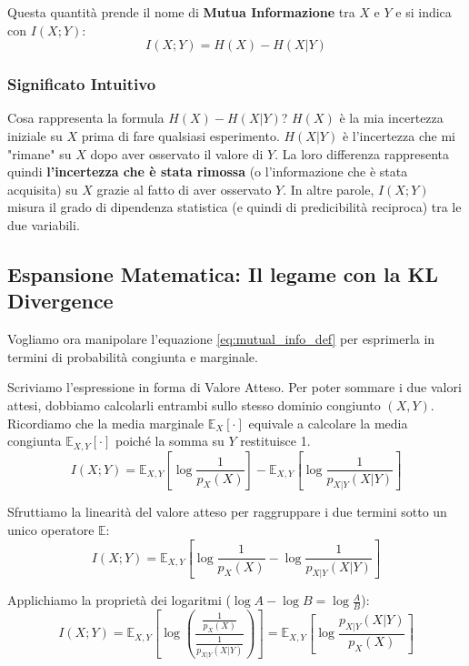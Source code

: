 Questa quantità prende il nome di \textbf{Mutua Informazione} tra $X$ e $Y$ e si indica con $I(X;Y)$:
\begin{equation}
\label{eq:mutual_info_def}
    I(X;Y) = H(X) - H(X|Y)
\end{equation}

\subsubsection*{Significato Intuitivo}
Cosa rappresenta la formula $H(X) - H(X|Y)$? 
$H(X)$ è la mia incertezza iniziale su $X$ prima di fare qualsiasi esperimento. $H(X|Y)$ è l'incertezza che mi "rimane" su $X$ dopo aver osservato il valore di $Y$. 
La loro differenza rappresenta quindi \textbf{l'incertezza che è stata rimossa} (o l'informazione che è stata acquisita) su $X$ grazie al fatto di aver osservato $Y$. In altre parole, $I(X;Y)$ misura il grado di dipendenza statistica (e quindi di predicibilità reciproca) tra le due variabili.

\subsection{Espansione Matematica: Il legame con la KL Divergence}

Vogliamo ora manipolare l'equazione \ref{eq:mutual_info_def} per esprimerla in termini di probabilità congiunta e marginale. 

Scriviamo l'espressione in forma di Valore Atteso. Per poter sommare i due valori attesi, dobbiamo calcolarli entrambi sullo stesso dominio congiunto $(X,Y)$. Ricordiamo che la media marginale $\mathbb{E}_X[\cdot]$ equivale a calcolare la media congiunta $\mathbb{E}_{X,Y}[\cdot]$ poiché la somma su $Y$ restituisce 1.
\begin{equation}
    I(X;Y) = \mathbb{E}_{X,Y} \left[ \log \frac{1}{p_X(X)} \right] - \mathbb{E}_{X,Y} \left[ \log \frac{1}{p_{X|Y}(X|Y)} \right]
\end{equation}

Sfruttiamo la linearità del valore atteso per raggruppare i due termini sotto un unico operatore $\mathbb{E}$:
\begin{equation}
    I(X;Y) = \mathbb{E}_{X,Y} \left[ \log \frac{1}{p_X(X)} - \log \frac{1}{p_{X|Y}(X|Y)} \right]
\end{equation}

Applichiamo la proprietà dei logaritmi ($\log A - \log B = \log \frac{A}{B}$):
\begin{equation}
    I(X;Y) = \mathbb{E}_{X,Y} \left[ \log \left( \frac{\frac{1}{p_X(X)}}{\frac{1}{p_{X|Y}(X|Y)}} \right) \right] = \mathbb{E}_{X,Y} \left[ \log \frac{p_{X|Y}(X|Y)}{p_X(X)} \right]
\end{equation}

